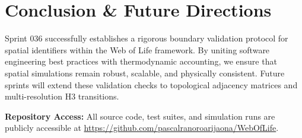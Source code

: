 \documentclass[11pt, a4paper]{article}
\begin{document}
\section{Conclusion \& Future Directions}
Sprint 036 successfully establishes a rigorous boundary validation protocol for spatial identifiers within the Web of Life framework. By uniting software engineering best practices with thermodynamic accounting, we ensure that spatial simulations remain robust, scalable, and physically consistent. Future sprints will extend these validation checks to topological adjacency matrices and multi-resolution H3 transitions.

\vspace{1em}
\noindent\textbf{Repository Access:} All source code, test suites, and simulation runs are publicly accessible at \url{https://github.com/pascalranoroarijaona/WebOfLife}.
\end{document}
